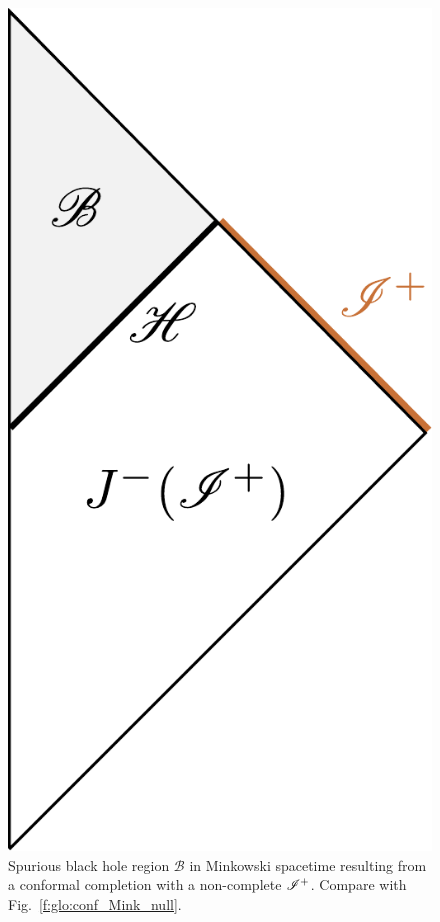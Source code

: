 \begin{figure}
\centerline{\includegraphics[height=0.3\textheight]{glo_spurious_bh.pdf}}
\caption[]{\label{f:glo:spurious_bh} \footnotesize
Spurious black hole region $\mathscr{B}$ in Minkowski spacetime resulting
from a conformal completion with a non-complete $\mathscr{I}^+$.
Compare with Fig.~\ref{f:glo:conf_Mink_null}.}
\end{figure}



